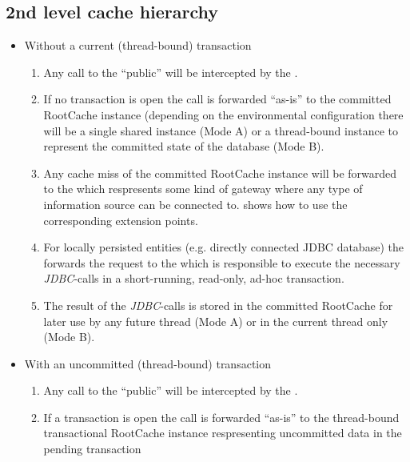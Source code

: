 \subsection{2nd level cache hierarchy}

\def\showimgref{img/gen/2013-01-02-DeK-RootCache-Request-Processing-1}

\begin{itemize}
	\item Without a current (thread-bound) transaction
		\begin{enumerate}
			\item Any call to the ``public''  will be intercepted by the .
			\item If no transaction is open the call is forwarded ``as-is'' to the committed RootCache instance (depending on the environmental configuration there will be a single shared instance (Mode A) or a thread-bound instance to represent the committed state of the database (Mode B).
			\item Any cache miss of the committed RootCache instance will be forwarded to the  which respresents some kind of gateway where any type of information source can be connected to.  shows how to use the corresponding extension points.
			\item For locally persisted entities (e.g. directly connected JDBC database) the  forwards the request to the  which is responsible to execute the necessary \emph{JDBC}-calls in a short-running, read-only, ad-hoc transaction.
			\item The result of the \emph{JDBC}-calls is stored in the committed RootCache for later use by any future thread (Mode A) or in the current thread only (Mode B).
		\end{enumerate}
	\item With an uncommitted (thread-bound) transaction
		\begin{enumerate}
			\item Any call to the ``public''  will be intercepted by the .
			\item If a transaction is open the call is forwarded ``as-is'' to the thread-bound transactional RootCache instance respresenting uncommitted data in the pending transaction

\end{enumerate}
\end{itemize}
